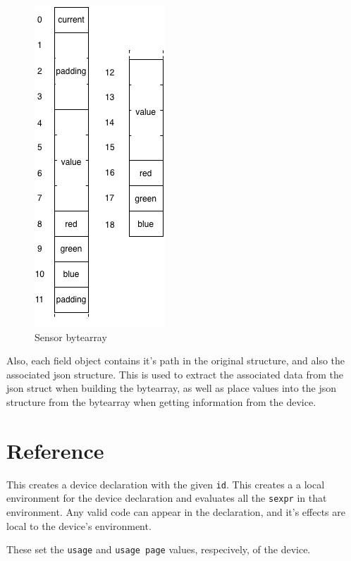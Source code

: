 \documentclass[12pt]{article}
\begin{document}
\begin{figure}[htbp] %
   \centering
   \includegraphics[]{sensor_bytearray.png} 
\caption{Sensor bytearray}
\label{fig:sensorbytearray}
\end{figure}


Also, each field object contains it's path in the original
structure, and also the associated json structure. This is used to
extract the associated data from the json struct when building the
bytearray, as well as place values into the json structure from the
bytearray when getting information from the device.

\section{Reference}


This creates a device declaration with the given \verb|id|. This
creates a a local environment for the device declaration and evaluates
all the \verb|sexpr| in that environment. Any valid code can appear in
the declaration, and it's effects are local to the device's
environment.


These set the \verb|usage| and \verb|usage page| values, respecively, of the device.
\end{document}
